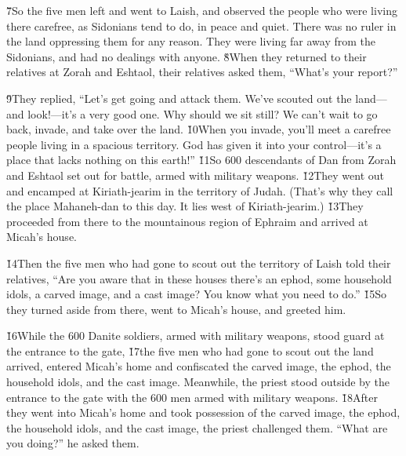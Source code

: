 \v{7}So the five men left and went to Laish, and observed the people who were living there carefree, as Sidonians tend to do, in peace and quiet. There was no ruler in the land oppressing them for any reason. They were living far away from the Sidonians, and had no dealings with anyone. \v{8}When they returned to their relatives at Zorah and Eshtaol, their relatives asked them, ``What's your report?''

\v{9}They replied, ``Let's get going and attack them. We've scouted out the land---and look!---it's a very good one. Why should we sit still? We can't wait to go back, invade, and take over the land. \v{10}When you invade, you'll meet a carefree people living in a spacious territory. God has given it into your control---it's a place that lacks nothing on this earth!'' \v{11}So 600 descendants of Dan from Zorah and Eshtaol set out for battle, armed with military weapons. \v{12}They went out and encamped at Kiriath-jearim in the territory of Judah. (That's why they call the place Mahaneh-dan to this day. It lies west of Kiriath-jearim.) \v{13}They proceeded from there to the mountainous region of Ephraim and arrived at Micah's house.

\v{14}Then the five men who had gone to scout out the territory of Laish told their relatives, ``Are you aware that in these houses there's an ephod, some household idols, a carved image, and a cast image? You know what you need to do.'' \v{15}So they turned aside from there, went to Micah's house, and greeted him.

\v{16}While the 600 Danite soldiers, armed with military weapons, stood guard at the entrance to the gate, \v{17}the five men who had gone to scout out the land arrived, entered Micah's home and confiscated the carved image, the ephod, the household idols, and the cast image. Meanwhile, the priest stood outside by the entrance to the gate with the 600 men armed with military weapons. \v{18}After they went into Micah's home and took possession of the carved image, the ephod, the household idols, and the cast image, the priest challenged them. ``What are you doing?'' he asked them.

